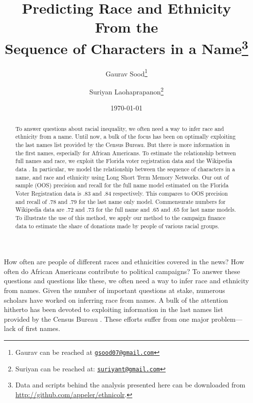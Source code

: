 \documentclass[12pt, letterpaper]{article}
\title{\Large{Predicting Race and Ethnicity From the\\Sequence of Characters in a Name}\footnote{Data and scripts behind the analysis presented here can be downloaded from \url{http://github.com/appeler/ethnicolr}.
}}
\author{Gaurav Sood\thanks{Gaurav can be reached at \href{mailto:gsood07@gmail.com}{\footnotesize{\texttt{gsood07@gmail.com}}}} \and Suriyan Laohaprapanon\thanks{Suriyan can be reached at: \href{mailto:suriyant@gmail.com}{\footnotesize{\texttt{suriyant@gmail.com}}}}\vspace{.5cm}}
\date{\vspace{.5cm}\normalsize{\today}}
\begin{document}
\maketitle

\begin{center}
\end{center}

\begin{comment}

setwd(paste0(githubdir, "ethnicolr_paper/"))
tools::texi2dvi("name_race.tex", pdf = TRUE, clean = TRUE) 
setwd(basedir)

\end{comment}


\begin{abstract}
To answer questions about racial inequality, we often need a way to infer race and ethnicity from a name. Until now, a bulk of the focus has been on optimally exploiting the last names list provided by the Census Bureau. But there is more information in the first names, especially for African Americans. To estimate the relationship between full names and race, we exploit the Florida voter registration data and the Wikipedia data \citep{ambekar2009name}. In particular, we model the relationship between the sequence of characters in a name, and race and ethnicity using Long Short Term Memory Networks. Our out of sample (OOS) precision and recall for the full name model estimated on the Florida Voter Registration data is .83 and .84 respectively. This compares to OOS precision and recall of .78 and .79 for the last name only model. Commensurate numbers for Wikipedia data are .72 and .73 for the full name and .65 and .65 for last name models. To illustrate the use of this method, we apply our method to the campaign finance data to estimate the share of donations made by people of various racial groups.
\end{abstract}
\clearpage
\doublespace

How often are people of different races and ethnicities covered in the news? How often do African Americans contribute to political campaigns? To answer these questions and questions like these, we often need a way to infer race and ethnicity from names. Given the number of important questions at stake, numerous scholars have worked on inferring race from names. A bulk of the attention hitherto has been devoted to exploiting information in the last names list provided by the Census Bureau \citep[see, e.g.,][]{fiscella2006use, imai2016improving}. These efforts suffer from one major problem---lack of first names. 
\end{document}
